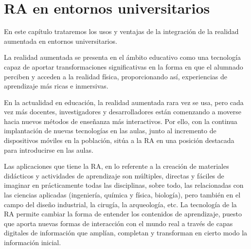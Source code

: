 %
%
%
%

\chapter{RA en entornos universitarios } \label{chap:RAEntornosUniversitarios}  

En este capítulo trataremos los usos y ventajas de la integración de la realidad aumentada en entornos universitarios.

La realidad aumentada se presenta en el ámbito educativo como una tecnología capaz de aportar transformaciones significativas en la forma en que el alumnado perciben y acceden a la realidad física, proporcionando así, experiencias de aprendizaje más ricas e inmersivas.

En la actualidad en educación, la realidad aumentada rara vez se usa, pero cada vez más docentes, investigadores y desarrolladores están comenzando a moverse hacia nuevos métodos de enseñanza más interactivos. Por ello, con la continua implantación de nuevas tecnologías en las aulas, junto al incremento de dispositivos móviles en la población, sitúa a la RA en una posición destacada para introducirse en las aulas. 

Las aplicaciones que tiene la RA, en lo referente a la creación de materiales didácticos y actividades de aprendizaje son múltiples, directas y fáciles de imaginar en prácticamente todas las disciplinas, sobre todo, las relacionadas con las ciencias aplicadas (ingeniería, química y física, biología), pero también en el campo del diseño industrial, la cirugía, la arqueología, etc.
La tecnología de la RA permite cambiar la forma de entender los contenidos de aprendizaje, puesto que aporta nuevas formas de interacción con el mundo real a través de capas digitales de información que amplían, completan y transforman en cierto modo la información inicial.

